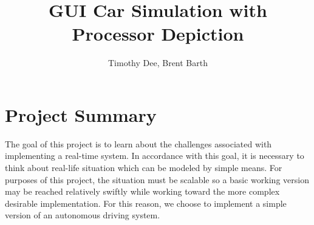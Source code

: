 \documentclass{article} %
\author{Timothy Dee, Brent Barth}
\title{GUI Car Simulation with Processor Depiction}
\begin{document}
\twocolumn
\thispagestyle{empty}   %
\maketitle      %


%
%
%
%


\section{Project Summary}
The goal of this project is to learn about the challenges associated with implementing a real-time system.
In accordance with this goal, it is necessary to think about real-life situation which can be modeled by simple means.
For purposes of this project, the situation must be scalable so a basic working version may be reached relatively swiftly while working toward the more complex desirable implementation.
For this reason, we choose to implement a simple version of an autonomous driving system.
\end{document}
